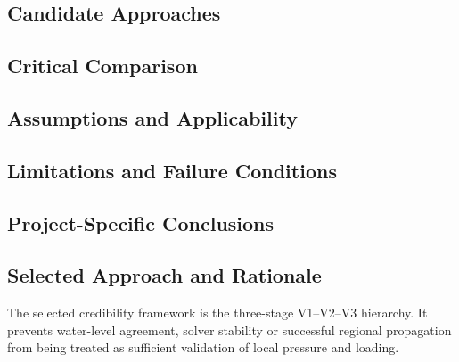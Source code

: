 \subsection{Candidate Approaches}
\label{sec:res-ver-frm-candidate-approaches}


\subsection{Critical Comparison}
\label{sec:res-ver-frm-critical-comparison}


\subsection{Assumptions and Applicability}
\label{sec:res-ver-frm-assumptions}


\subsection{Limitations and Failure Conditions}
\label{sec:res-ver-frm-limitations}


\subsection{Project-Specific Conclusions}
\label{sec:res-ver-frm-conclusions}


\subsection{Selected Approach and Rationale}
\label{sec:res-ver-frm-selected-approach}


The selected credibility framework is the three-stage V1--V2--V3
hierarchy. It prevents water-level agreement, solver stability or
successful regional propagation from being treated as sufficient
validation of local pressure and loading.


